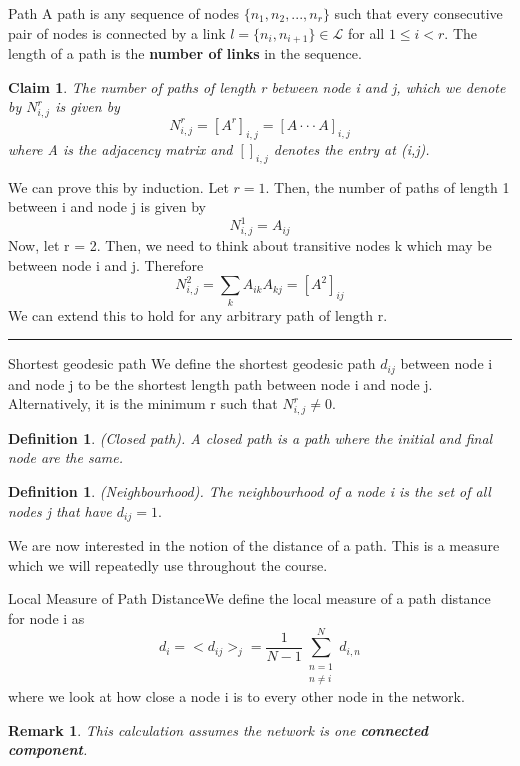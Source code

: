 \documentclass[twoside]{article}
\newtheorem{claim}[theorem]{Claim}
\newtheorem{definition}[theorem]{Definition}
\newtheorem{remark}[theorem]{Remark}
\newenvironment{proof}{{\bf Proof:}}{\hfill\rule{2mm}{2mm}}
\begin{document}
\begin{definition_exam}{Path}{} A path is any sequence of nodes $\{n_1, n_2, ..., n_r\}$ such that every consecutive pair of nodes is connected by a link $l = \{n_i, n_{i + 1}\} \in \mathcal{L}$ for all $1 \leq i < r$. The length of a path is the \textbf{number of links} in the sequence.
\end{definition_exam}

\begin{claim}The number of paths of length r between node i and j, which we denote by $N_{i,j}^r$ is given by 
$$
N_{i,j}^r = [A^r]_{i,j} = [A \cdot \cdot \cdot A]_{i,j}
$$
where A is the adjacency matrix and $[]_{i,j}$ denotes the entry at (i,j).
\end{claim}

\begin{proof} We can prove this by induction. Let $r = 1.$ Then, the number of paths of length 1 between i and node j is given by 
$$
N_{i,j}^{1} = A_{ij}
$$
Now, let r = 2. Then, we need to think about transitive nodes k which may be between node i and j. Therefore 
$$
N_{i,j}^{2} = \sum_{k}A_{ik}A_{kj} = [A^2]_{ij}
$$
We can extend this to hold for any arbitrary path of length r.
\end{proof}

\begin{definition_exam}{Shortest geodesic path}{} We define the shortest geodesic path $d_{ij}$ between node i and node j to be the shortest length path between node i and node j. Alternatively, it is the minimum r such that $N_{i,j}^r \neq 0.$
\end{definition_exam}

\begin{definition}(Closed path). A closed path is a path where the initial and final node are the same.
\end{definition}

\begin{definition}(Neighbourhood). The neighbourhood of a node i is the set of all nodes j that have $d_{ij} = 1.$
\end{definition}

We are now interested in the notion of the distance of a path. This is a measure which we will repeatedly use throughout the course.

\begin{definition_exam}{Local Measure of Path Distance}{}We define the local measure of a path distance for node i as 
$$
d_i = <d_{ij}>_j = \frac{1}{N-1}\sum_{\substack{n=1\\ n \neq i}}^{N}d_{i,n}
$$
where we look at how close a node i is to every other node in the network.
\end{definition_exam}
\begin{remark}This calculation assumes the network is one \textbf{connected component}.
\end{remark}
\end{document}
